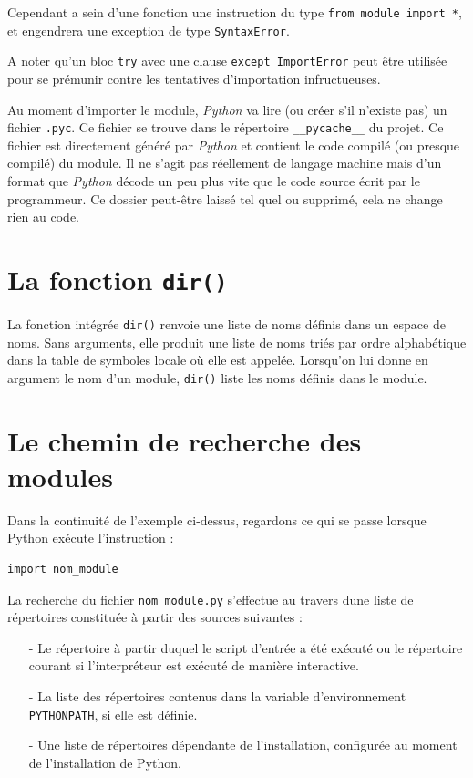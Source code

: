 \documentclass[a4paper,11pt]{book}
\begin{document}
Cependant a sein d'une fonction une instruction du type \texttt{from module import *}, et engendrera une exception de type \texttt{SyntaxError}.
\medskip

A noter qu'un bloc \texttt{try} avec une clause \texttt{except ImportError} peut être utilisée pour se prémunir contre les tentatives d'importation infructueuses.
\medskip

Au moment d'importer le module, \textit{Python} va lire (ou créer s'il n'existe pas) un fichier \texttt{.pyc}. Ce fichier se trouve dans le répertoire \texttt{\_\_pycache\_\_} du projet. Ce fichier est directement généré par \textit{Python} et contient le code compilé (ou presque compilé) du module. Il ne s'agit pas réellement de langage machine mais d'un format que \textit{Python} décode un peu plus vite que le code source écrit par le programmeur. Ce dossier peut-être laissé tel quel ou supprimé, cela ne change rien au code.
\medskip

\section{La fonction \texttt{dir()}}
La fonction intégrée \texttt{dir()} renvoie une liste de noms définis dans un espace de noms. Sans arguments, elle produit une liste de noms triés par ordre alphabétique dans la table de symboles locale où elle est appelée. Lorsqu'on lui donne en argument le nom d'un module, \texttt{dir()} liste les noms définis dans le module.
\medskip

\section{Le chemin de recherche des modules}
Dans la continuité de l'exemple ci-dessus, regardons ce qui se passe lorsque Python exécute l'instruction :
\begin{lstlisting}[caption=Importation d'un module]
import nom_module
\end{lstlisting}
\medskip

La recherche du fichier \texttt{nom\_module.py} s'effectue au travers dune liste de répertoires constituée à partir des sources suivantes :
\begin{itemize}
	\item[-] Le répertoire à partir duquel le script d'entrée a été exécuté ou le répertoire courant si l'interpréteur est exécuté de manière interactive.
	\item[-] La liste des répertoires contenus dans la variable d'environnement \texttt{PYTHONPATH}, si elle est définie.
	\item[-] Une liste de répertoires dépendante de l'installation, configurée au moment de l'installation de Python.
\end{itemize}
\medskip
\end{document}

